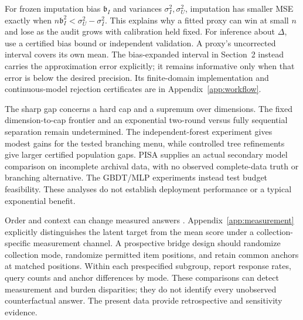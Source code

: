 For frozen imputation bias $\mathfrak b_I$ and variances $\sigma_I^2,\sigma_U^2$,
imputation has smaller MSE exactly when
$n\mathfrak b_I^2<\sigma_U^2-\sigma_I^2$. This explains why a fitted proxy can win at
small $n$ and lose as the audit grows with calibration held fixed.
For inference about $\Delta$, use a certified bias bound or independent
validation. A proxy's uncorrected interval covers its own mean. The
bias-expanded interval in Section~2 instead carries the approximation error
explicitly; it remains informative only when that error is below the desired
precision. Its finite-domain implementation and continuous-model rejection
certificates are in Appendix~\ref{app:workflow}.

The sharp gap concerns a hard cap and a supremum over dimensions.
The fixed dimension-to-cap frontier and an exponential two-round versus
fully sequential separation remain undetermined. The independent-forest
experiment gives modest gains for the tested branching menu, while
controlled tree refinements give larger certified population gaps. PISA
supplies an actual secondary model comparison on incomplete archival data,
with no observed complete-data truth or branching alternative. The
GBDT/MLP experiments instead test budget feasibility. These analyses do
not establish deployment performance or a typical exponential benefit.

Order and context can change measured answers \citep{schuman1981}.
Appendix~\ref{app:measurement} explicitly distinguishes the latent target
from the mean score under a collection-specific measurement channel.
A prospective bridge design should randomize collection mode, randomize
permitted item positions, and retain common anchors at matched positions.
Within each prespecified subgroup, report response rates, query counts and
anchor differences by mode. These comparisons can detect measurement and
burden disparities; they do not identify every unobserved counterfactual
answer. The present data provide retrospective and sensitivity evidence.
